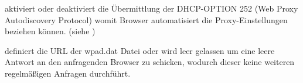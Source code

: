 \begin{description}
     
     {aktiviert oder deaktiviert die Übermittlung der DHCP-OPTION 252 (Web Proxy Autodiscovery Protocol)
     womit Browser automatisiert die Proxy-Einstellungen beziehen können.
     (siehe )
     }
     
     
     {definiert die URL der wpad.dat Datei oder wird leer gelassen um eine leere Antwort
     an den anfragenden Browser zu schicken, wodurch dieser keine weiteren regelmäßigen Anfragen durchführt.
     }
     
\end{description}
